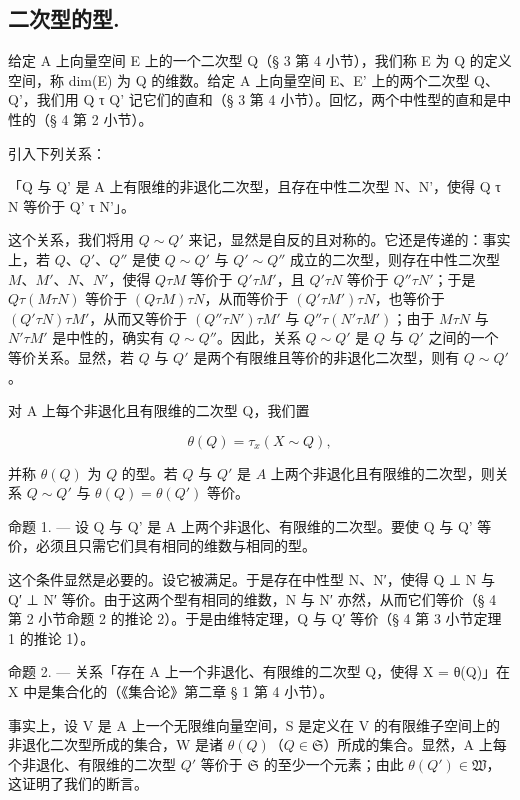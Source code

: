 \subsection{二次型的型.}

  给定 A 上向量空间 E 上的一个二次型 Q（§ 3 第 4 小节），我们称 E 为 Q 的定义空间，称 dim(E) 为 Q 的维数。给定 A 上向量空间 E、E' 上的两个二次型 Q、Q'，我们用 Q τ Q' 记它们的直和（§ 3 第 4 小节）。回忆，两个中性型的直和是中性的（§ 4 第 2 小节）。

  引入下列关系：

「Q 与 Q' 是 A 上有限维的非退化二次型，且存在中性二次型 N、N'，使得 Q τ N 等价于 Q' τ N'」。

  这个关系，我们将用 \(Q \sim Q'\) 来记，显然是自反的且对称的。它还是传递的：事实上，若 \(Q\)、\(Q'\)、\(Q''\) 是使 \(Q \sim Q'\) 与 \(Q' \sim Q''\) 成立的二次型，则存在中性二次型 \(M\)、\(M'\)、\(N\)、\(N'\)，使得 \(Q \tau M\) 等价于 \(Q' \tau M'\)，且 \(Q' \tau N\) 等价于 \(Q'' \tau N'\)；于是 \(Q \tau (M \tau N)\) 等价于 \((Q \tau M) \tau N\)，从而等价于 \((Q' \tau M') \tau N\)，也等价于 \((Q' \tau N) \tau M'\)，从而又等价于 \((Q'' \tau N') \tau M'\) 与 \(Q'' \tau (N' \tau M')\)；由于 \(M \tau N\) 与 \(N' \tau M'\) 是中性的，确实有 \(Q \sim Q''\)。因此，关系 \(Q \sim Q'\) 是 \(Q\) 与 \(Q'\) 之间的一个等价关系。显然，若 \(Q\) 与 \(Q'\) 是两个有限维且等价的非退化二次型，则有 \(Q \sim Q'\)。

  对 A 上每个非退化且有限维的二次型 Q，我们置

\[
\theta (Q) = \tau_ {x} (X \sim Q),\tag{1}
\]

并称 \(\theta(Q)\) 为 \(Q\) 的型。若 \(Q\) 与 \(Q'\) 是 \(A\) 上两个非退化且有限维的二次型，则关系 \(Q \sim Q'\) 与 \(\theta(Q) = \theta(Q')\) 等价。

命题 1. --- 设 Q 与 Q' 是 A 上两个非退化、有限维的二次型。要使 Q 与 Q' 等价，必须且只需它们具有相同的维数与相同的型。

  这个条件显然是必要的。设它被满足。于是存在中性型 N、N′，使得 Q ⊥ N 与 Q′ ⊥ N′ 等价。由于这两个型有相同的维数，N 与 N′ 亦然，从而它们等价（§ 4 第 2 小节命题 2 的推论 2）。于是由维特定理，Q 与 Q′ 等价（§ 4 第 3 小节定理 1 的推论 1）。

命题 2. --- 关系「存在 A 上一个非退化、有限维的二次型 Q，使得 X = θ(Q)」在 X 中是集合化的（《集合论》第二章 § 1 第 4 小节）。

  事实上，设 V 是 A 上一个无限维向量空间，S 是定义在 V 的有限维子空间上的非退化二次型所成的集合，W 是诸 \(\theta(Q)\)（\(Q \in \mathfrak{S}\)）所成的集合。显然，A 上每个非退化、有限维的二次型 \(Q'\) 等价于 \(\mathfrak{S}\) 的至少一个元素；由此 \(\theta(Q') \in \mathfrak{W}\)，这证明了我们的断言。

